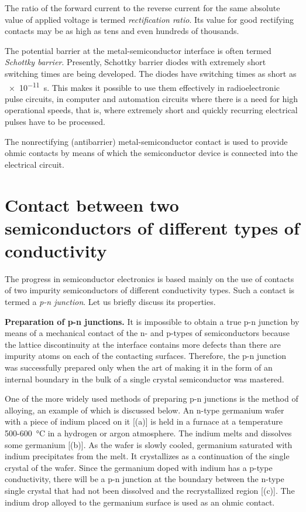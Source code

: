 The ratio of the forward current to the reverse current for the same absolute value of applied voltage is termed \textit{rectification ratio}. Its value for good rectifying contacts may be as high as tens and even hundreds of thousands.

The potential barrier at the metal-semiconductor interface is often termed \textit{Schottky barrier}. Presently, Schottky barrier diodes with extremely short switching times are being developed. The diodes have switching times as short as \SI{e-11}{\second}. This makes it possible to use them effectively in radioelectronic pulse circuits, in computer and automation circuits where there is a need for high operational speeds, that is, where extremely short and quickly recurring electrical pulses have to be processed.

The nonrectifying (antibarrier) metal-semiconductor contact is used to provide ohmic contacts by means of which the semiconductor device is connected into the electrical circuit.

\section{Contact between two semiconductors of different types of conductivity}\label{sec:76}

The progress in semiconductor electronics is based mainly on the use of contacts of two impurity semiconductors of different conductivity types. Such a contact is termed a \textit{p-n junction}. Let us briefly discuss its properties.

\textbf{Preparation of p-n junctions.} It is impossible to obtain a true p-n junction by means of a mechanical contact of the n- and p-types of semiconductors because the lattice discontinuity at the interface contains more defects than there are impurity atoms on each of the contacting surfaces. Therefore, the p-n junction was successfully prepared only when the art of making it in the form of an internal boundary in the bulk of a single crystal semiconductor was mastered.

One of the more widely used methods of preparing p-n junctions is the method of alloying, an example of which is discussed below. An n-type germanium wafer with a piece of indium placed on it [(a)] is held in a furnace at a temperature \num{500}-\SI{600}{\degreeCelsius} in a hydrogen or argon atmosphere. The indium melts and dissolves some germanium [(b)]. As the wafer is slowly cooled, germanium saturated with indium precipitates from the melt. It crystallizes as a continuation of the single crystal of the wafer. Since the germanium doped with indium has a p-type conductivity, there will be a p-n junction at the boundary between the n-type single crystal that had not been dissolved and the recrystallized region [(c)]. The indium drop alloyed to the germanium surface is used as an ohmic contact.

